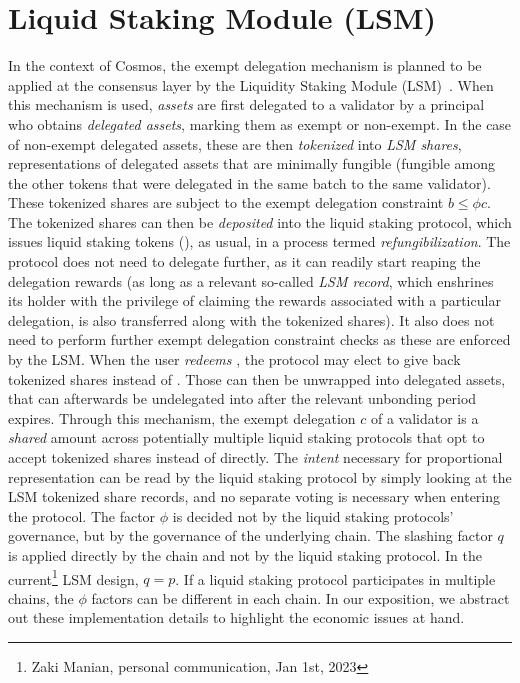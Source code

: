 \section{Liquid Staking Module (LSM)}\label{sec:lsm}
In the context
of Cosmos, the exempt delegation mechanism is planned to be applied at the consensus
layer by the Liquidity Staking Module (LSM)~\cite{liquidity-staking-module}.
When this mechanism is used, \emph{assets} are first delegated to a validator by
a principal who obtains \emph{delegated assets}, marking them as exempt or non-exempt.
In the case of non-exempt delegated assets, these are then
\emph{tokenized} into \emph{LSM shares}, representations of delegated assets that
are minimally fungible (fungible among the other tokens that were delegated in the
same batch to the same validator). These tokenized
shares are subject to the exempt delegation constraint $b \leq \phi c$. The tokenized shares
can then be \emph{deposited} into the liquid staking protocol, which issues liquid staking
tokens (\stassets), as usual, in a process termed \emph{refungibilization}.
The protocol does not need to delegate further, as it can readily start reaping the
delegation rewards (as long as a relevant so-called \emph{LSM record}, which
enshrines its holder with the privilege of claiming the rewards associated with a
particular delegation, is also transferred along with the tokenized shares).
It also does not need to perform further exempt delegation constraint checks as
these are enforced by the LSM.
When the user \emph{redeems} \stassets, the protocol may elect to give
back tokenized shares instead of \assets. Those can then be unwrapped into delegated assets,
that can afterwards be undelegated into \assets after the relevant unbonding
period expires.
Through this mechanism, the exempt delegation $c$ of a validator is
a \emph{shared} amount across potentially multiple liquid staking
protocols that opt to accept tokenized shares
instead of \assets directly. The \emph{intent} necessary for proportional
representation can be read by the liquid staking protocol by simply
looking at the LSM tokenized share records, and no separate voting is
necessary when entering the protocol. The factor $\phi$ is decided not by the
liquid staking protocols' governance, but by the governance of
the underlying chain. The slashing factor $q$ is applied directly
by the chain and not by the liquid staking protocol.
In the current\footnote{Zaki Manian, personal communication, Jan 1st, 2023}
LSM design, $q = p$.
If a liquid staking protocol participates in
multiple chains, the $\phi$ factors can be different in each chain.
In our exposition, we abstract out these implementation details to highlight
the economic issues at hand.